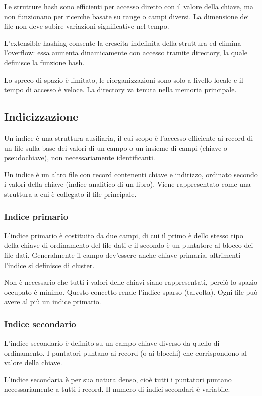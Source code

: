 Le strutture hash sono efficienti per accesso diretto con il valore della chiave, ma non funzionano per ricerche basate su range o campi diversi. La dimensione dei file non deve subire variazioni significative nel tempo.

L'extensible hashing consente la crescita indefinita della struttura ed elimina l'overflow: essa aumenta dinamicamente con accesso tramite directory, la quale definisce la funzione hash. 

Lo spreco di spazio è limitato, le riorganizzazioni sono solo a livello locale e il tempo di accesso è veloce. La directory va tenuta nella memoria principale.

\subsection{Indicizzazione}
Un indice è una struttura ausiliaria, il cui scopo è l'accesso efficiente ai record di un file sulla base dei valori di un campo o un insieme di campi (chiave o pseudochiave), non necessariamente identificanti.

Un indice è un altro file con record contenenti chiave e indirizzo, ordinato secondo i valori della chiave (indice analitico di un libro). Viene rappresentato come una struttura a cui è collegato il file principale.

\subsubsection{Indice primario}
L'indice primario è costituito da due campi, di cui il primo è dello stesso tipo della chiave di ordinamento del file dati e il secondo è un puntatore al blocco dei file dati. Generalmente il campo dev'essere anche chiave primaria, altrimenti l'indice si definisce di cluster.

Non è necessario che tutti i valori delle chiavi siano rappresentati, perciò lo spazio occupato è minimo. Questo concetto rende l'indice sparso (talvolta). Ogni file può avere al più un indice primario.

\subsubsection{Indice secondario}
L'indice secondario è definito su un campo chiave diverso da quello di ordinamento. I puntatori puntano ai record (o ai blocchi) che corrispondono al valore della chiave.

L'indice secondaria è per sua natura denso, cioè tutti i puntatori puntano necessariamente a tutti i record. Il numero di indici secondari è variabile.

